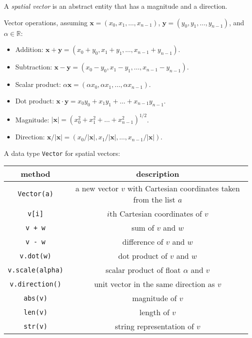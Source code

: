 \documentclass[8pt,a4paper,compress,handout]{beamer}
\begin{document}
\begin{frame}[fragile]
A \emph{spatial vector} is an abstract entity that has a magnitude and a direction.

\bigskip

Vector operations, assuming $\mathbf{x}=(x_0,x_1,\dots,x_{n-1})$, $\mathbf{y}=(y_0,y_1,\dots,y_{n-1})$, and $\alpha \in \mathbb{R}$:
\begin{itemize}
\item Addition: $\mathbf{x}+\mathbf{y}=(x_0+y_0,x_1+y_1,\dots,x_{n-1}+y_{n-1})$.
\item Subtraction: $\mathbf{x}-\mathbf{y}=(x_0-y_0,x_1-y_1,\dots,x_{n-1}-y_{n-1})$.
\item Scalar product: $\alpha\mathbf{x}=(\alpha x_0,\alpha x_1,\dots,\alpha x_{n-1})$.
\item Dot product: $\mathbf{x}\cdot\mathbf{y}=x_0y_0+x_1y_1+\dots+x_{n-1}y_{n-1}$.
\item Magnitude: $|\mathbf{x}|=(x_0^2+x_1^2+\dots+x_{n-1}^2)^{1/2}$.
\item Direction: $\mathbf{x}/|\mathbf{x}|=(x_0/|\mathbf{x}|,x_1/|\mathbf{x}|,\dots,x_{n-1}/|\mathbf{x}|)$.
\end{itemize}
\end{frame}

\begin{frame}[fragile]
A data type \lstinline{Vector} for spatial vectors:
\begin{center}
\begin{tabular}{cc}
method & description \\ \hline
\lstinline$Vector(a)$ & a new vector $v$ with Cartesian coordinates taken from the list $a$ \\
\lstinline$v[i]$ & $i$th Cartesian coordinates of $v$ \\
\lstinline$v + w$ & sum of $v$ and $w$ \\
\lstinline$v - w$ & difference of $v$ and $w$ \\
\lstinline$v.dot(w)$ & dot product of $v$ and $w$ \\
\lstinline$v.scale(alpha)$ & scalar product of float $\alpha$ and $v$ \\
\lstinline$v.direction()$ & unit vector in the same direction as $v$ \\
\lstinline$abs(v)$ & magnitude of $v$ \\
\lstinline$len(v)$ & length of $v$ \\
\lstinline$str(v)$ & string representation of $v$
\end{tabular} 
\end{center}
\end{frame}
\end{document}
